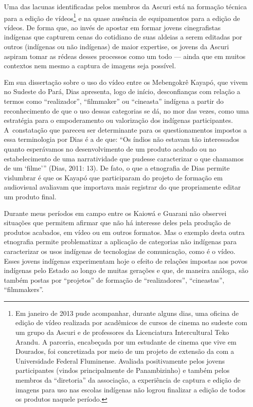 Uma das lacunas identificadas pelos membros da Ascuri está na formação
técnica para a edição de vídeos\footnote[12]{Em janeiro de 2013 pude
acompanhar, durante alguns dias, uma oficina de edição de vídeo
realizada por acadêmicos de cursos de cinema no sudeste com um grupo da
Ascuri e de professores da Licenciatura Intercultural Teko Arandu. A
parceria, encabeçada por um estudante de cinema que vive em Dourados,
foi concretizada por meio de um projeto de extensão da  com a
Universidade Federal Fluminense. Avaliada positivamente pelos jovens
participantes (vindos principalmente de Panambizinho) e também pelos
membros da ``diretoria'' da associação, a experiência de captura e edição
de imagens para uso nas escolas indígenas não logrou finalizar a edição
de todos os produtos naquele período. } e na quase ausência de
equipamentos para a edição de vídeos. De forma que, ao invés de apostar
em formar jovens cinegrafistas indígenas que capturem cenas do
cotidiano de suas aldeias a serem editadas por outros (indígenas ou não
indígenas) de maior expertise, os jovens da Ascuri aspiram tomar as
rédeas desses processos como um todo --- ainda que em muitos contextos
nem mesmo a captura de imagens seja possível.

Em sua dissertação sobre o uso do vídeo entre os Mebengokrê Kayapó, que
vivem no Sudeste do Pará, Dias apresenta, logo de início, desconfianças
com relação a termos como ``realizador'', ``filmmaker'' ou ``cineasta''
indígena a partir do reconhecimento de que o uso dessas categorias se
dá, no mor das vezes, como uma estratégia para o empoderamento ou
valorização dos indígenas participantes. A~constatação que pareceu ser
determinante para os questionamentos impostos a essa terminologia por
Dias é a de que: ``Os índios não estavam tão interessados quanto
esperávamos no desenvolvimento de um produto acabado ou no
estabelecimento de uma narratividade que pudesse caracterizar o que
chamamos de um ‘filme’'' (Dias, 2011: 13). De fato, o que a etnografia
de Dias permite vislumbrar é que os Kayapó que participaram do projeto
de formação em audiovisual avaliavam que importava mais registrar do
que propriamente editar um produto final.

Durante meus períodos em campo entre os Kaiowá e Guarani não observei
situações que permitem afirmar que não há interesse deles pela produção
de produtos acabados, em vídeo ou em outros formatos. Mas o exemplo
desta outra etnografia permite problematizar a aplicação de categorias
não indígenas para caracterizar os usos indígenas de tecnologias de
comunicação, como é o vídeo. Esses jovens indígenas experimentam hoje o
efeito de relações impostas aos povos indígenas pelo Estado ao longo de
muitas gerações e que, de maneira análoga, são também postas por
``projetos'' de formação de ``realizadores'', ``cineastas'', ``filmmakers''.

